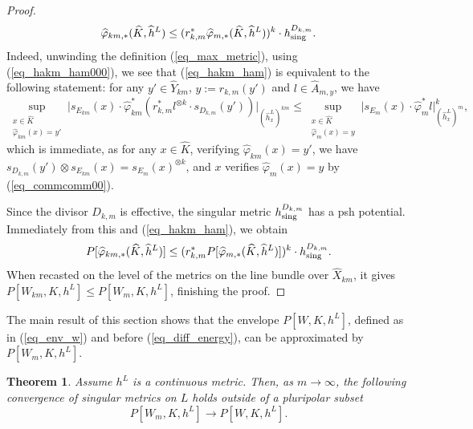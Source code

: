 \documentclass[12pt]{article}
\numberwithin{equation}{section}
\theoremstyle{theorem}
\newtheorem{thm}{Theorem}[section]
\theoremstyle{definition}
\theoremstyle{remark}
\begin{document}
\begin{proof}
		\begin{equation}\label{eq_hakm_ham}
			\widehat{\varphi}_{km, *} (\widehat{K}, \widehat{h}^L)
			\leq
			(r_{k, m}^* \widehat{\varphi}_{m, *} (\widehat{K}, \widehat{h}^L))^k \cdot h^{D_{k, m}}_{\rm{sing}}.
		\end{equation}
		Indeed, unwinding the definition (\ref{eq_max_metric}), using (\ref{eq_hakm_ham000}), we see that (\ref{eq_hakm_ham}) is equivalent to the following statement: for any $y' \in \widehat{Y}_{km}$, $y := r_{k, m}(y')$ and $l \in \widehat{A}_{m, y}$, we have 
		\begin{equation}\label{eq_max_metric_commm}
			\sup_{\substack{x \in \widehat{K} \\ \widehat{\varphi}_{km}(x) = y'}} \big| s_{E_{km}}(x) \cdot \widehat{\varphi}_{km}^* ( r_{k, m}^* l^{\otimes k} \cdot s_{D_{k, m}}(y')) \big|_{(\widehat{h}^L_x)^{km}}
			\leq
			\sup_{\substack{x \in \widehat{K} \\ \widehat{\varphi}_{m}(x) = y}} \big| s_{E_{m}}(x) \cdot \widehat{\varphi}_{m}^* l \big|_{(\widehat{h}^L_x)^{m}}^{k},
		\end{equation}
		which is immediate, as for any $x \in \widehat{K}$, verifying $\widehat{\varphi}_{km}(x) = y'$, we have $s_{D_{k, m}}(y') \otimes s_{E_{km}}(x) = s_{E_{m}}(x)^{\otimes k}$, and $x$ verifies $\widehat{\varphi}_{m}(x) = y$ by (\ref{eq_commcomm00}). 
		\par 
		Since the divisor $D_{k, m}$ is effective, the singular metric $h^{D_{k, m}}_{\rm{sing}}$ has a psh potential.
		Immediately from this and (\ref{eq_hakm_ham}), we obtain
		\begin{equation}
			P[\widehat{\varphi}_{km, *} (\widehat{K}, \widehat{h}^L)]
			\leq
			(r_{k, m}^* P[\widehat{\varphi}_{m, *} (\widehat{K}, \widehat{h}^L)])^k \cdot h^{D_{k, m}}_{\rm{sing}}.
		\end{equation}
		When recasted on the level of the metrics on the line bundle over $\widehat{X}_{km}$, it gives $P[W_{km}, K, h^L] \leq P[W_m, K, h^L]$, finishing the proof.
	\end{proof}
	\par 
	The main result of this section shows that the envelope $P[W, K, h^L]$, defined as in (\ref{eq_env_w}) and before (\ref{eq_diff_energy}), can be approximated by $P[W_m, K, h^L]$.
	\begin{thm}\label{prop_two_quant_sch}
		Assume $h^L$ is a continuous metric.
		Then, as $m \to \infty$, the following convergence of singular metrics on $L$ holds outside of a pluripolar subset
		\begin{equation}\label{eq_two_quant_sch}
			P[W_m, K, h^L]
			\to
			P[W, K, h^L].
		\end{equation}
	\end{thm}
	
\end{document}

